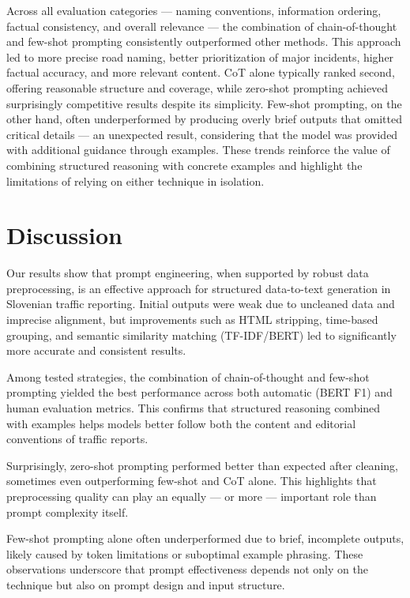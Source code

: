 \documentclass[fleqn,moreauthors,10pt]{ds_report}
\begin{document}
Across all evaluation categories — naming conventions, information ordering, factual consistency, and overall relevance — the combination of chain-of-thought and few-shot prompting consistently outperformed other methods. This approach led to more precise road naming, better prioritization of major incidents, higher factual accuracy, and more relevant content. CoT alone typically ranked second, offering reasonable structure and coverage, while zero-shot prompting achieved surprisingly competitive results despite its simplicity. Few-shot prompting, on the other hand, often underperformed by producing overly brief outputs that omitted critical details — an unexpected result, considering that the model was provided with additional guidance through examples. These trends reinforce the value of combining structured reasoning with concrete examples and highlight the limitations of relying on either technique in isolation.

\section*{Discussion}

Our results show that prompt engineering, when supported by robust data preprocessing, is an effective approach for structured data-to-text generation in Slovenian traffic reporting. Initial outputs were weak due to uncleaned data and imprecise alignment, but improvements such as HTML stripping, time-based grouping, and semantic similarity matching (TF-IDF/BERT) led to significantly more accurate and consistent results.\newline

Among tested strategies, the combination of chain-of-thought and few-shot prompting yielded the best performance across both automatic (BERT F1) and human evaluation metrics. This confirms that structured reasoning combined with examples helps models better follow both the content and editorial conventions of traffic reports.\newline

Surprisingly, zero-shot prompting performed better than expected after cleaning, sometimes even outperforming few-shot and CoT alone. This highlights that preprocessing quality can play an equally — or more — important role than prompt complexity itself.\newline

Few-shot prompting alone often underperformed due to brief, incomplete outputs, likely caused by token limitations or suboptimal example phrasing. These observations underscore that prompt effectiveness depends not only on the technique but also on prompt design and input structure.\newline
\end{document}
